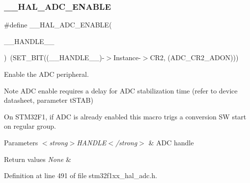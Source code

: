 \subsubsection{\texorpdfstring{\+\_\+\+\_\+\+H\+A\+L\+\_\+\+A\+D\+C\+\_\+\+E\+N\+A\+B\+LE}{\_\_HAL\_ADC\_ENABLE}}
{\footnotesize\ttfamily \#define \+\_\+\+\_\+\+H\+A\+L\+\_\+\+A\+D\+C\+\_\+\+E\+N\+A\+B\+LE(\begin{DoxyParamCaption}\item[{}]{\+\_\+\+\_\+\+H\+A\+N\+D\+L\+E\+\_\+\+\_\+ }\end{DoxyParamCaption})~(S\+E\+T\+\_\+\+B\+IT((\+\_\+\+\_\+\+H\+A\+N\+D\+L\+E\+\_\+\+\_\+)-\/$>$Instance-\/$>$C\+R2, (A\+D\+C\+\_\+\+C\+R2\+\_\+\+A\+D\+ON)))}



Enable the A\+DC peripheral. 

\begin{DoxyNote}{Note}
A\+DC enable requires a delay for A\+DC stabilization time (refer to device datasheet, parameter t\+S\+T\+AB) 

On S\+T\+M32\+F1, if A\+DC is already enabled this macro trigs a conversion SW start on regular group. 
\end{DoxyNote}

\begin{DoxyParams}{Parameters}
{\em $<$strong$>$\+H\+A\+N\+D\+L\+E$<$/strong$>$} & A\+DC handle \\
\hline
\end{DoxyParams}

\begin{DoxyRetVals}{Return values}
{\em None} & \\
\hline
\end{DoxyRetVals}


Definition at line 491 of file stm32f1xx\+\_\+hal\+\_\+adc.\+h.

\mbox{\label{group___a_d_c___exported___macros_ga650073de508d335d0a1c7bf9b4d07afe}} 

